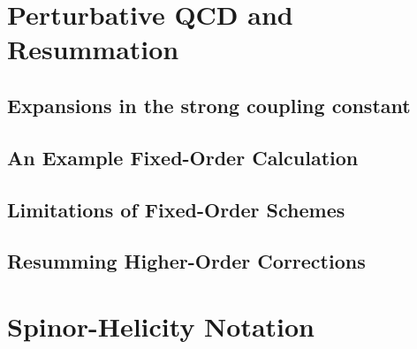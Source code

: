 
\section{Perturbative QCD and Resummation}

	\subsection{Expansions in the strong coupling constant}

	\subsection{An Example Fixed-Order Calculation}

	\subsection{Limitations of Fixed-Order Schemes}

	\subsection{Resumming Higher-Order Corrections}


\section{Spinor-Helicity Notation}
\label{sec:SpinorHelicity}



